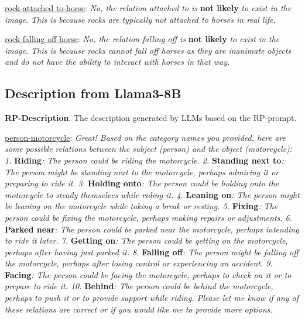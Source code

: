 \underline{rock-attached to-horse}: \textit{No, the relation attached to is} \textbf{not likely} \textit{to exist in the image. This is because rocks are typically not attached to horses in real life.}

\underline{rock-falling off-horse}: \textit{No, the relation falling off is} \textbf{not likely} \textit{to exist in the image. This is because rocks cannot fall off horses as they are inanimate objects and do not have the ability to interact with horses in that way.}

\subsection{Description from Llama3-8B}

\noindent \textbf{RP-Description}.
The description generated by LLMs based on the RP-prompt.

\underline{person-motorcycle}: \textit{Great! Based on the category names you provided, here are some possible relations between the subject (person) and the object (motorcycle): 1.} \textbf{Riding}\textit{: The person could be riding the motorcycle. 2.} \textbf{Standing next to}\textit{: The person might be standing next to the motorcycle, perhaps admiring it or preparing to ride it. 3.} \textbf{Holding onto}\textit{: The person could be holding onto the motorcycle to steady themselves while riding it. 4.} \textbf{Leaning on}\textit{: The person might be leaning on the motorcycle while taking a break or resting. 5.} \textbf{Fixing}\textit{: The person could be fixing the motorcycle, perhaps making repairs or adjustments. 6.} \textbf{Parked near}\textit{: The person could be parked near the motorcycle, perhaps intending to ride it later. 7.} \textbf{Getting on}\textit{: The person could be getting on the motorcycle, perhaps after having just parked it. 8.} \textbf{Falling off}\textit{: The person might be falling off the motorcycle, perhaps after losing control or experiencing an accident. 9.} \textbf{Facing}\textit{: The person could be facing the motorcycle, perhaps to check on it or to prepare to ride it. 10.} \textbf{Behind}\textit{: The person could be behind the motorcycle, perhaps to push it or to provide support while riding. Please let me know if any of these relations are correct or if you would like me to provide more options.}

